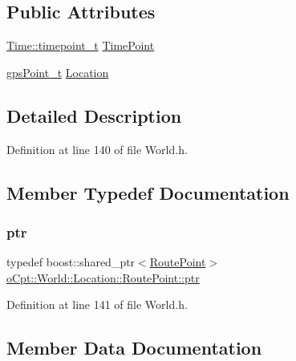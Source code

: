 \subsection*{Public Attributes}
\begin{DoxyCompactItemize}
\item 
\hyperlink{classo_cpt_1_1_world_1_1_time_a6a6e782c3c90622c1c7070b0a223ec4c}{Time\+::timepoint\+\_\+t} \hyperlink{structo_cpt_1_1_world_1_1_location_1_1_route_point_ab1843ea5bc2555a1258f15578198fb3d}{Time\+Point}
\item 
\hyperlink{classo_cpt_1_1_world_1_1_location_a3aa5e31e2888b4da40ad534b99473888}{gps\+Point\+\_\+t} \hyperlink{structo_cpt_1_1_world_1_1_location_1_1_route_point_af28b02113dd9042cc49e661d29330fe5}{Location}
\end{DoxyCompactItemize}


\subsection{Detailed Description}


Definition at line 140 of file World.\+h.



\subsection{Member Typedef Documentation}
\hypertarget{structo_cpt_1_1_world_1_1_location_1_1_route_point_aa042feea77cb3c1531ab4e8ecf42fbd6}{}\label{structo_cpt_1_1_world_1_1_location_1_1_route_point_aa042feea77cb3c1531ab4e8ecf42fbd6} 
\subsubsection{\texorpdfstring{ptr}{ptr}}
{\footnotesize\ttfamily typedef boost\+::shared\+\_\+ptr$<$\hyperlink{structo_cpt_1_1_world_1_1_location_1_1_route_point}{Route\+Point}$>$ \hyperlink{structo_cpt_1_1_world_1_1_location_1_1_route_point_aa042feea77cb3c1531ab4e8ecf42fbd6}{o\+Cpt\+::\+World\+::\+Location\+::\+Route\+Point\+::ptr}}



Definition at line 141 of file World.\+h.



\subsection{Member Data Documentation}
\hypertarget{structo_cpt_1_1_world_1_1_location_1_1_route_point_af28b02113dd9042cc49e661d29330fe5}{}\label{structo_cpt_1_1_world_1_1_location_1_1_route_point_af28b02113dd9042cc49e661d29330fe5} 
